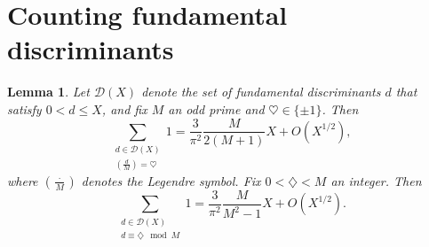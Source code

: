 \documentclass[11pt,reqno]{amsart} \usepackage{fullpage}
\newtheorem{lemma}{Lemma}
\renewcommand{\leq}{\leqslant}
\renewcommand{\d}[1]{\,\operatorname*{d}\!{#1}}
\newcommand\be{\begin{equation}}
\newcommand\ee{\end{equation}}
\numberwithin{equation}{section}
\begin{document}
\appendix

\section{Counting fundamental discriminants}\label{sec:funcountproof}
\begin{lemma}\label{lem:funcount}
  Let $\mathcal D(X)$ denote the set of fundamental discriminants $d$ that satisfy
  $0<d\leq X$, and fix $M$ an odd prime and $\heartsuit\in\{\pm1\}$. Then
  \be\label{eq:funasymp1}
  \sum_{\substack{d\in\mathcal D(X)\\\left(\frac d M\right)=\heartsuit}}1
  =\frac3{\pi^2}\frac M{2(M+1)}X+O\left(X^{1/2}\right),\ee
  where $\left(\frac\cdot M\right)$ denotes the Legendre symbol.
  Fix $0<\diamondsuit<M$ an integer. Then
  \be\label{eq:funasymp2}\sum_{\substack{d\in\mathcal D(X)\\d\equiv\diamondsuit\mod M}}1
  =\frac3{\pi^2}\frac M{M^2-1}X+O\left(X^{1/2}\right).\ee
\end{lemma}
\end{document}
